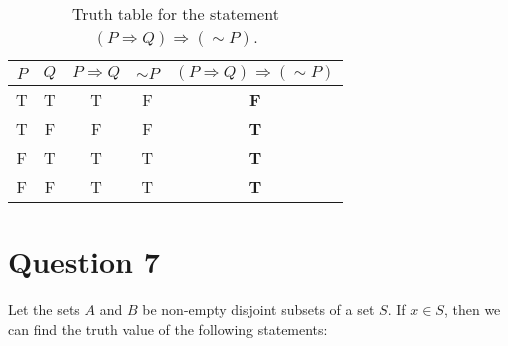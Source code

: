 \documentclass[11pt, oneside]{article}   	%
\begin{document}
\begin{table}[h]                                           %
\begin{center}
\begin{tabular}{c c | c  c || c}                                %
    $P$ & $Q$ & $P \Rightarrow Q$ & $\sim P$ & $(P \Rightarrow Q) \Rightarrow (\sim P)$ \\
    \hline
    T & T & T & F & \textbf{F} \\
    T & F & F & F & \textbf{T} \\
    F & T & T & T & \textbf{T} \\
    F & F & T & T & \textbf{T} \\   					          
\end{tabular}
\end{center}

\caption{Truth table for the statement $(P \Rightarrow Q) \Rightarrow (\sim P)$.}
\label{tab:bleh} 
\end{table}


\section*{Question 7}

Let the sets $A$ and $B$ be non-empty disjoint subsets of a set $S$. If $x \in S$, then we can find the truth value of the following statements:
\end{document}
